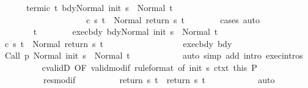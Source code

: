 \begin{isabellebody}
\ \ \ \ \ \ termi{\isacharunderscore}c{\isacharcolon}\ {\isachardoublequoteopen}{\isasymforall}t{\isachardot}\ {\isasymGamma}{\isasymturnstile}{\isasymlangle}bdy{\isacharcomma}Normal\ {\isacharparenleft}init\ s{\isacharparenright}{\isasymrangle}\ {\isasymRightarrow}\ Normal\ t\ {\isasymlongrightarrow}\ \isanewline
\ \ \ \ \ \ \ \ \ \ \ \ \ \ \ \ \ \ \ \ {\isasymGamma}{\isasymturnstile}c\ s\ t\ {\isasymdown}\ Normal\ {\isacharparenleft}return{\isacharprime}\ s\ t{\isacharparenright}{\isachardoublequoteclose}\isanewline
\ \ \ \ \ \ \isamarkupfalse%
\ cases\ auto\ \isanewline
\ \ \ \ \isacommand{{\isacharbraceleft}}\isamarkupfalse%
\isanewline
\ \ \ \ \ \ \isamarkupfalse%
\ t\isanewline
\ \ \ \ \ \ \isamarkupfalse%
\ exec{\isacharunderscore}bdy{\isacharcolon}\ {\isachardoublequoteopen}{\isasymGamma}{\isasymturnstile}{\isasymlangle}bdy{\isacharcomma}Normal\ {\isacharparenleft}init\ s{\isacharparenright}{\isasymrangle}\ {\isasymRightarrow}\ Normal\ t{\isachardoublequoteclose}\isanewline
\ \ \ \ \ \ \isamarkupfalse%
\ {\isachardoublequoteopen}{\isasymGamma}{\isasymturnstile}c\ s\ t\ {\isasymdown}\ Normal\ {\isacharparenleft}return\ s\ t{\isacharparenright}{\isachardoublequoteclose}\isanewline
\ \ \ \ \ \ \isamarkupfalse%
\ {\isacharminus}\isanewline
\ \ \ \ \ \ \ \ \isamarkupfalse%
\ exec{\isacharunderscore}bdy\ bdy\isanewline
\ \ \ \ \ \ \ \ \isamarkupfalse%
\ {\isachardoublequoteopen}{\isasymGamma}{\isasymturnstile}{\isasymlangle}{\isacharparenleft}Call\ p\ {\isacharparenright}{\isacharcomma}Normal\ {\isacharparenleft}init\ s{\isacharparenright}{\isasymrangle}\ {\isasymRightarrow}\ Normal\ t{\isachardoublequoteclose}\isanewline
\ \ \ \ \ \ \ \ \ \ \isamarkupfalse%
\ {\isacharparenleft}auto\ simp\ add{\isacharcolon}\ intro{\isacharcolon}\ exec{\isachardot}intros{\isacharparenright}\isanewline
\ \ \ \ \ \ \ \ \isamarkupfalse%
\ cvalidD\ {\isacharbrackleft}OF\ valid{\isacharunderscore}modif\ {\isacharbrackleft}rule{\isacharunderscore}format{\isacharcomma}\ of\ {\isachardoublequoteopen}init\ s{\isachardoublequoteclose}{\isacharbrackright}\ ctxt{\isacharprime}\ this{\isacharbrackright}\ P\ \isanewline
\ \ \ \ \ \ \ \ \ \ res{\isacharunderscore}modif\isanewline
\ \ \ \ \ \ \ \ \isamarkupfalse%
\ {\isachardoublequoteopen}return{\isacharprime}\ s\ t\ {\isacharequal}\ return\ s\ t{\isachardoublequoteclose}\isanewline
\ \ \ \ \ \ \ \ \ \ \isamarkupfalse%
\ auto\isanewline
\ \ \ \ \ \ \ \ \isamarkupfalse%

\end{isabellebody}
